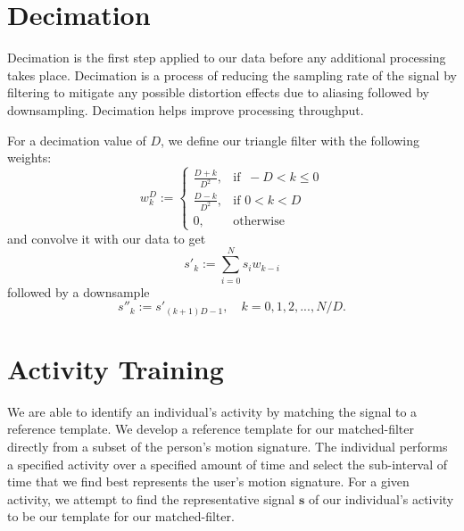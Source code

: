 \documentclass{sciposter}
\begin{document}
\begin{multicols}{3}
\section{Decimation}
Decimation is the first step applied to our data before any additional processing takes place.
Decimation is a process of reducing the sampling rate of the signal by filtering to mitigate any possible distortion effects due to aliasing followed by downsampling.
Decimation helps improve processing throughput.

For a decimation value of $D$, we define our triangle filter with the following weights:
%
\begin{equation} \label{eq:triangle_filter_weights}
w_k^D :=
\begin{cases}
  \frac{D+k}{D^2}, & \text{if }\ -D < k \leq 0 \\
  \frac{D-k}{D^2}, & \text{if } 0 < k < D \\
  0, & \text{otherwise}
\end{cases}
\end{equation}
%
and convolve it with our data to get
%
\begin{equation} \label{eq:convolve}
s'_k := \sum_{i=0}^{N} s_i w_{k-i}
\end{equation}
%
followed by a downsample
%
\begin{equation} \label{eq:downsample}
s''_k := s'_{(k+1)D-1}, \quad k = 0, 1, 2, ..., N/D.
\end{equation}

\section{Activity Training}
We are able to identify an individual's activity by matching the signal to a reference template.
We develop a reference template for our matched-filter directly from a subset of the person's motion signature.
The individual performs a specified activity over a specified amount of time and select the sub-interval of time that we find best represents the user's motion signature.
For a given activity, we attempt to find the representative signal $\textbf{s}$ of our individual's activity to be our template for our matched-filter.


\end{multicols}
\end{document}

